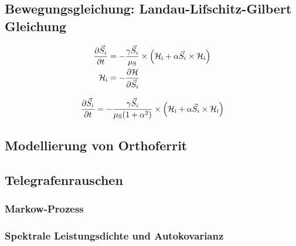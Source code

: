 \documentclass[main.tex]{subfiles}
\begin{document}
\subsection{Bewegungsgleichung: Landau-Lifschitz-Gilbert Gleichung}

\begin{align} 
    \pdv{\vec{S}_i}{t} &= -\frac{\gamma \vec{S}_i}{\mu_{\text{S}}} \times \qty(\mathcal{H}_{\text{i}} + \alpha \vec{S}_i \times \mathcal{H}_{\text{i}}) \\
    \mathcal{H}_{\text{i}} &= - \pdv{\mathcal{H}}{\vec{S}_i}
\end{align}


\begin{align}
    \pdv{\vec{S}_i}{t} = -\frac{\gamma \vec{S}_i}{\mu_{\text{S}}(1+\alpha^2)} \times
    \qty(\mathcal{H}_{\text{i}} + \alpha \vec{S}_i \times \mathcal{H}_{\text{i}})
\end{align}

\subsection{Modellierung von Orthoferrit}

\subsection{Telegrafenrauschen}

\subsubsection*{Markow-Prozess}






\subsubsection*{Spektrale Leistungsdichte und Autokovarianz}

% 
\end{document}
